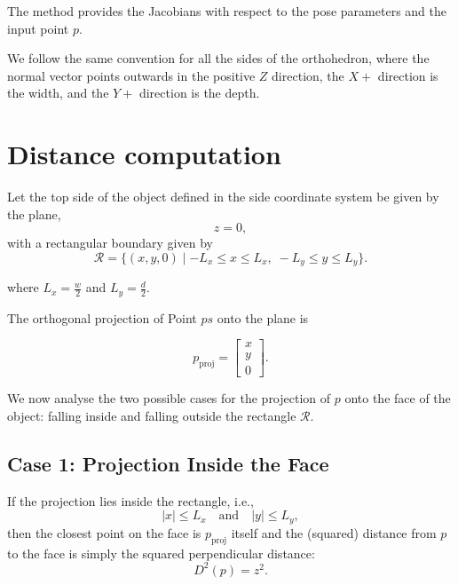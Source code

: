 \documentclass[11pt]{article}
\begin{document}
    The method provides the Jacobians with respect to the pose parameters and the input point \(p\).

    We follow the same convention for all the sides of the orthohedron, where the normal vector points outwards in the positive $Z$ direction, the $X+$ direction is the width, and the $Y+$ direction is the depth.

    \section*{Distance computation}

    Let the top side of the object defined in the side coordinate system be given by the plane,
    \begin{equation}
        z = 0,
    \end{equation}
    with a rectangular boundary given by
    \begin{equation}
        \mathcal{R} = \{ (x,y,0) \mid -L_x \le x \le L_x,\; -L_y \le y \le L_y \}.
    \end{equation}

    where \(L_x = \frac{w}{2}\) and \(L_y = \frac{d}{2}\).

    The orthogonal projection of Point $ps$ onto the plane is

    \begin{equation}
        p_{\text{proj}} = \begin{bmatrix} x \\ y \\ 0 \end{bmatrix}.
    \end{equation}

    We now analyse the two possible cases for the projection of \(p\) onto the face of the object: falling inside and falling outside the rectangle \(\mathcal{R}\).

    \subsection*{Case 1: Projection Inside the Face}

        If the projection lies inside the rectangle, i.e.,
        \begin{equation}
            |x| \le L_x \quad \text{and} \quad |y| \le L_y,
        \end{equation}
        then the closest point on the face is \(p_{\text{proj}}\) itself and the (squared) distance from \(p\) to the face is simply the squared perpendicular distance:
        \begin{equation}
            D^2(p) = z^2.
        \end{equation}
\end{document}
